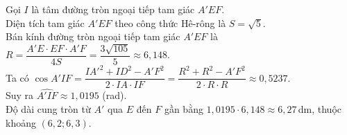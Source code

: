 \begin{ex}
{\begin{itemchoice}
			Gọi $I$ là tâm đường tròn ngoại tiếp tam giác $A'EF$.\\
			Diện tích tam giác $A'EF$ theo công thức Hê-rông là $S=\sqrt{5}$.\\
			Bán kính đường tròn ngoại tiếp tam giác $A'EF$ là
			$R=\dfrac{A'E\cdot EF\cdot A'F}{4S}=\dfrac{3\sqrt{105}}{5}\approx 6{,}148$.\\		
			Ta có $\cos \widehat{A'IF}=\dfrac{IA'^2+ID^2-A'F^2}{2\cdot IA\cdot IF}=\dfrac{R^2+R^2-A'F^2}{2\cdot R\cdot R}\approx 0{,}5237$.\\
			Suy ra $\widehat{A'IF}\approx1{,}0195$ (rad).\\			
			Độ dài cung tròn từ $A'$ qua $E$ đến $F$ gần bằng $1{,}0195\cdot 6{,}148\approx 6{,}27$\,dm, thuộc khoảng $(6{,}2;6{,}3)$.
		\end{itemchoice}
	}
\end{ex}
